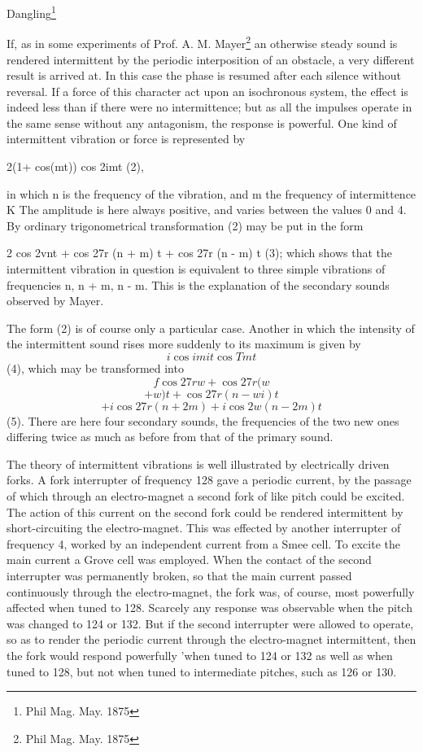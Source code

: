 Dangling\footnote{Phil Mag. May. 1875}

If, as in some experiments of Prof. A. M. Mayer\footnote{Phil Mag. May. 1875}
an otherwise steady sound is rendered intermittent by the periodic
interposition of an obstacle, a very different result is arrived at. In this
case the phase is resumed after each silence without reversal. If a force of
this character act upon an isochronous system, the effect is indeed less than
if there were no intermittence; but as all the impulses operate in the same
sense without any antagonism, the response is powerful. One kind of
intermittent vibration or force is represented by

 2(1+ cos(mt)) cos 2imt (2),

in which n is the frequency of the vibration, and m the frequency of
intermittence K The amplitude is here always positive, and varies between the
values 0 and 4. By ordinary trigonometrical transformation (2) may be put in
the form

2 cos 2vnt + cos 27r (n + m) t + cos 27r (n - m) t (3); which shows that the
intermittent vibration in question is equivalent to three simple vibrations of
frequencies n, n + m, n - m.  This is the explanation of the secondary sounds
observed by Mayer.

The form (2) is of course only a particular case. Another in which the
intensity of the intermittent sound rises more suddenly to its maximum is given
by
\[ i \cos im it \cos Tmt \]
(4), which may be transformed into
\[ f \cos 27rw + \cos 27r (w \]
\[ + w) t + \cos 27r (n - wi) t \]
\[ + i \cos 27r (n + 2m)  + i \cos 2w (n - 2m) t\]
(5).  There are here four secondary
sounds, the frequencies of the two new ones differing twice as much as before
from that of the primary sound.

The theory of intermittent vibrations is well illustrated by electrically
driven forks. A fork interrupter of frequency 128 gave a periodic current, by
the passage of which through an electro-magnet a second fork of like pitch
could be excited. The action of this current on the second fork could be
rendered intermittent by short-circuiting the electro-magnet. This was effected
by another interrupter of frequency 4, worked by an independent current from a
Smee cell. To excite the main current a Grove cell was employed. When the
contact of the second interrupter was permanently broken, so that the main
current passed continuously through the electro-magnet, the fork was, of
course, most powerfully affected when tuned to 128. Scarcely any response was
observable when the pitch was changed to 124 or 132.  But if the second
interrupter were allowed to operate, so as to render the periodic current
through the electro-magnet intermittent, then the fork would respond powerfully
'when tuned to 124 or 132 as well as when tuned to 128, but not when tuned to
intermediate pitches, such as 126 or 130.

